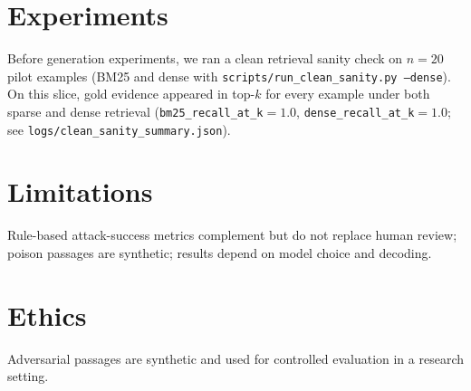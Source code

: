 \documentclass[11pt]{article}
\begin{document}
\section{Experiments}
Before generation experiments, we ran a clean retrieval sanity check on $n{=}20$ pilot examples (BM25 and dense with \texttt{scripts/run\_clean\_sanity.py --dense}). On this slice, gold evidence appeared in top-$k$ for every example under both sparse and dense retrieval (\texttt{bm25\_recall\_at\_k}$=1.0$, \texttt{dense\_recall\_at\_k}$=1.0$; see \texttt{logs/clean\_sanity\_summary.json}).

\begin{table}[t]
\centering
\caption{Pilot metrics by defense (generate via \texttt{python scripts/export\_tables.py}).}
\label{tab:pilot}

\end{table}

\begin{table}[t]
\centering
\caption{Ablation metrics by defense mode (generate via \texttt{python scripts/export\_tables.py}).}
\label{tab:ablation}

\end{table}

\section{Limitations}
Rule-based attack-success metrics complement but do not replace human review; poison passages are synthetic; results depend on model choice and decoding.

\section{Ethics}
Adversarial passages are synthetic and used for controlled evaluation in a research setting.



\end{document}
